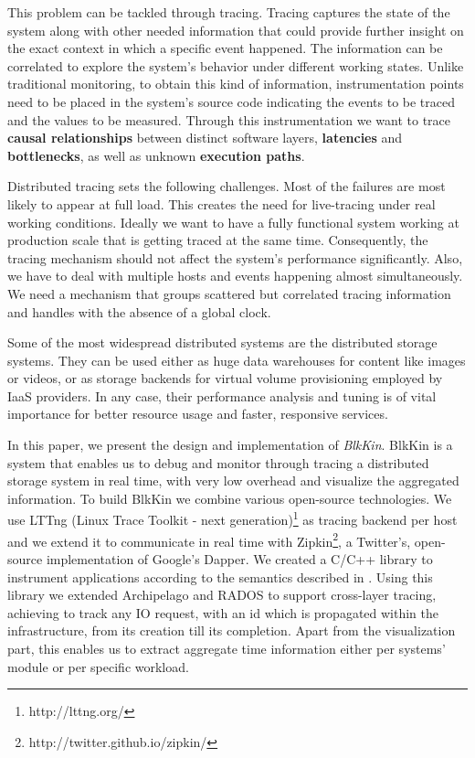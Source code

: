 \documentclass[a4paper,10pt,twocolumn]{article}
\begin{document}
This problem can be tackled through tracing. Tracing captures the state of the
system along with other needed information that could provide further insight
on the exact context in which a specific event happened. The information can be
correlated to explore the system's behavior under different working states.
Unlike traditional monitoring, to obtain this kind of information,
instrumentation points need to be placed in the system's source code indicating
the events to be traced and the values to be measured. Through this
instrumentation we want to trace \textbf{causal relationships} between distinct
software layers, \textbf{latencies} and \textbf{bottlenecks}, as well as
unknown \textbf{execution paths}.

Distributed tracing sets the following challenges. Most of the failures are most
likely to appear at full load. This creates the need for live-tracing under real
working conditions. Ideally we want to have a fully functional system working at
production scale that is getting traced at the same time. Consequently, the
tracing mechanism should not affect the system's performance significantly.
Also, we have to deal with multiple hosts and events happening almost
simultaneously. We need a mechanism that groups scattered but correlated tracing
information and handles with the absence of a global clock.

Some of the most widespread distributed systems are the distributed storage
systems. They can be used either as huge data warehouses for content like images
or videos, or as storage backends for virtual volume provisioning employed by
IaaS providers. In any case, their performance analysis and tuning is of vital
importance for better resource usage and faster, responsive services.

In this paper, we present the design and implementation of \emph{BlkKin}.
BlkKin is a system that enables us to debug and monitor through tracing a
distributed storage system in real time, with very low overhead and visualize
the aggregated information. To build BlkKin we combine various open-source
technologies. We use LTTng (Linux Trace Toolkit - next
generation)\footnote{http://lttng.org/} as tracing backend per host and we
extend it to communicate in real time with
Zipkin\footnote{http://twitter.github.io/zipkin/}, a Twitter's, open-source
implementation of Google's Dapper\cite{dapper}. We created a C/C++ library to
instrument applications according to the semantics described in \cite{dapper}.
Using this library we extended Archipelago\cite{archip} and RADOS\cite{rados} to
support cross-layer tracing, achieving to track any IO request, with an id which
is propagated within the infrastructure, from its creation
till its completion. Apart from the visualization part, this enables us to
extract aggregate time information either per systems' module or per specific
workload.
\end{document}
